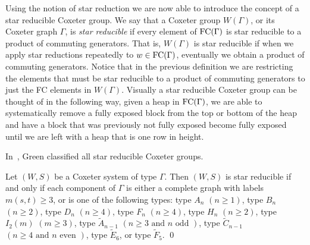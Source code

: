 Using the notion of star reduction we are now able to introduce the concept of a star reducible Coxeter group. We say that a Coxeter group $W(\Gamma)$, or its Coxeter graph $\Gamma$, is \emph{star reducible} if every element of $\mathrm{FC}(\Gamma)$ is star reducible to a product of commuting generators. That is, $W(\Gamma)$ is star reducible if when we apply star reductions repeatedly to $w \in \mathrm{FC}(\Gamma)$, eventually we obtain a product of commuting generators. Notice that in the previous definition we are restricting the elements that must be star reducible to a product of commuting generators to just the FC elements in $W(\Gamma)$. Visually a star reducible Coxeter group can be thought of in the following way, given a heap in $\mathrm{FC}(\Gamma)$, we are able to systematically remove a fully exposed block from the top or bottom of the heap and have a block that was previously not fully exposed become fully exposed until we are left with a heap that is one row in height. 

In~\cite{Green2006a}, Green classified all star reducible Coxeter groups.

\begin{theorem}
	Let $(W,S)$ be a Coxeter system of type $\Gamma$. Then $(W,S)$ is star reducible if and only if each component of $\Gamma$ is either a complete graph with labels $m(s,t)\geq 3$, or is one of the following types: type $A_n$ $(n \geq 1)$, type $B_n$ $(n \geq 2)$, type $D_n$ $(n \geq 4)$, type $F_n$ $(n \geq 4)$, type $H_n$ $(n \geq 2)$, type $I_2(m)$ $(m \geq 3)$, type $\widetilde{A}_{n-1}$ $(n \geq 3 \textrm{ and } n \textrm{ odd })$, type $\widetilde{C}_{n-1}$ $(n\geq 4 \textrm{ and } n \textrm{ even })$, type $\widetilde{E}_6$, or type $\widetilde{F}_5$. \qed
\end{theorem}    

